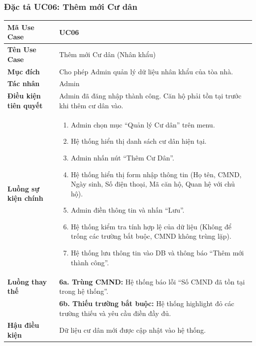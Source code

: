 \documentclass[12pt,a4paper]{article}
\begin{document}
\subsubsection{Đặc tả UC06: Thêm mới Cư dân}
\begin{table}[H]
    \centering
    \renewcommand{\arraystretch}{1.2}
    \begin{tabularx}{\textwidth}{|l|X|}
    \hline
    \textbf{Mã Use Case} & \textbf{UC06} \\
    \hline
    \textbf{Tên Use Case} & Thêm mới Cư dân (Nhân khẩu) \\
    \hline
    \textbf{Mục đích} & Cho phép Admin quản lý dữ liệu nhân khẩu của tòa nhà. \\
    \hline
    \textbf{Tác nhân} & Admin \\
    \hline
    \textbf{Điều kiện tiên quyết} & Admin đã đăng nhập thành công. Căn hộ phải tồn tại trước khi thêm cư dân vào. \\
    \hline
    \textbf{Luồng sự kiện chính} &
    \begin{enumerate}
        \item Admin chọn mục ``Quản lý Cư dân'' trên menu.
        \item Hệ thống hiển thị danh sách cư dân hiện tại.
        \item Admin nhấn nút ``Thêm Cư Dân''.
        \item Hệ thống hiển thị form nhập thông tin (Họ tên, CMND, Ngày sinh, Số điện thoại, Mã căn hộ, Quan hệ với chủ hộ).
        \item Admin điền thông tin và nhấn ``Lưu''.
        \item Hệ thống kiểm tra tính hợp lệ của dữ liệu (Không để trống các trường bắt buộc, CMND không trùng lặp).
        \item Hệ thống lưu thông tin vào DB và thông báo ``Thêm mới thành công''.
    \end{enumerate} \\
    \hline
    \textbf{Luồng thay thế} &
    \textbf{6a. Trùng CMND:} Hệ thống báo lỗi ``Số CMND đã tồn tại trong hệ thống''.\\
    & \textbf{6b. Thiếu trường bắt buộc:} Hệ thống highlight đỏ các trường thiếu và yêu cầu điền đầy đủ.\\
    \hline
    \textbf{Hậu điều kiện} & Dữ liệu cư dân mới được cập nhật vào hệ thống. \\
    \hline
    \end{tabularx}
\end{table}
\end{document}
